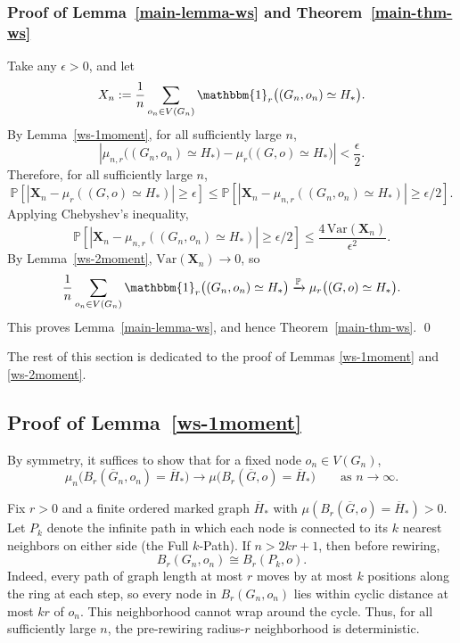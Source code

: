 \documentclass[10pt]{amsart}
\begin{document}
\subsubsection*{Proof of Lemma~\ref{main-lemma-ws} and Theorem~\ref{main-thm-ws}}
Take any $\epsilon>0$, and let
\[
\textbf{X}_n:=\frac{1}{n}\sum_{o_n\in V(G_n)} \mathbbm{1}_r\big((G_n,o_n)\simeq H_*\big).
\]
By Lemma~\ref{ws-1moment}, for all sufficiently large $n$,
\[
\left|\mu_{n,r}\big((G_n,o_n)\simeq H_*\big)-\mu_r\big((G,o)\simeq H_*\big)\right|<\frac{\epsilon}{2}.
\]
Therefore, for all sufficiently large $n$,
\[
\mathbb P\!\left[\left|\textbf{X}_n-\mu_r((G,o)\simeq H_*)\right|\ge \epsilon\right]
\le
\mathbb P\!\left[\left|\textbf{X}_n-\mu_{n,r}((G_n,o_n)\simeq H_*)\right|\ge \epsilon/2\right].
\]
Applying Chebyshev's inequality,
\[
\mathbb P\!\left[\left|\textbf{X}_n-\mu_{n,r}((G_n,o_n)\simeq H_*)\right|\ge \epsilon/2\right]
\le
\frac{4\,\mathrm{Var}(\textbf{X}_n)}{\epsilon^2}.
\]
By Lemma~\ref{ws-2moment}, $\mathrm{Var}(\textbf{X}_n)\to 0$, so
\[
\frac{1}{n}\sum_{o_n\in V(G_n)} \mathbbm{1}_r\big((G_n,o_n)\simeq H_*\big) \xrightarrow{\mathbb P} \mu_r\big((G,o)\simeq H_*\big).
\]
This proves Lemma~\ref{main-lemma-ws}, and hence Theorem~\ref{main-thm-ws}. \qed 

The rest of this section is dedicated to the proof of Lemmas \ref{ws-1moment} and \ref{ws-2moment}.

\subsection*{Proof of Lemma~\ref{ws-1moment}}

By symmetry, it suffices to show that for a fixed node $o_n \in V(G_n)$,
\begin{equation}\label{goal1}
\mu_n\big(B_r(\overline{G}_n,o_n)=\overline{H}_*\big)\to
\mu\big(B_r(\overline{G},o)=\overline{H}_*\big)
\qquad\text{as }n\to\infty.
\end{equation}

Fix $r>0$ and a finite ordered marked graph $\overline{H}_*$ with $\mu(B_r(\overline{G},o)=\overline{H}_*)>0$. Let $P_k$ denote the infinite path in which each node is connected to its $k$ nearest neighbors on either side (the Full $k$-Path). If $n>2kr+1$, then before rewiring,
\begin{equation}\label{pre-ring}
B_r(G_n,o_n)\cong B_r(P_k,o).
\end{equation}
Indeed, every path of graph length at most $r$ moves by at most $k$ positions along the ring at each step, so every node in $B_r(G_n,o_n)$ lies within cyclic distance at most $kr$ of $o_n$. This neighborhood cannot wrap around the cycle. Thus, for all sufficiently large $n$, the pre-rewiring radius-$r$ neighborhood is deterministic. 
\end{document}

